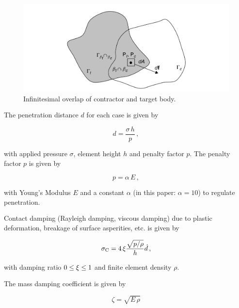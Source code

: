 \begin{figure}[!htbp]
    \centering
    \includegraphics[width=\columnwidth]{Contact.png}
    \caption{Infinitesimal overlap of contractor and target body. \cite{Mun04}}
    \label{fig:contact}
\end{figure}

\bigbreak
The penetration distance $d$ for each case is given by \cite{Mun04}

\begin{equation}
    \label{eq:d}
    d=\frac{\sigma\,h}{p}\,,
\end{equation}

with applied pressure $\sigma$, element height $h$ and penalty factor $p$. 
\bigbreak
The penalty factor $p$ is given by

\begin{equation}
    \label{eq:p}
    p=\alpha\,E\,,
\end{equation}

with \rm{Young's Modulus} $E$ and a constant $\alpha$ (in this paper: $\alpha=10$) to regulate penetration. 

\bigbreak
Contact damping (Rayleigh damping, viscous damping) due to plastic deformation, breakage of surface asperities, etc. is given by \cite{Mun04}

\begin{equation}
    \label{eq:sigmac}
    \sigma_{\rm{C}}=4\,\xi\frac{\sqrt{p/\rho}}{h}\dot{d}\,,
\end{equation}

\addtocounter{footnote}{-1}
with damping ratio $0\leq\xi\leq1$ and finite element density $\rho$.  


\bigbreak
The mass damping coefficient is given by

\begin{equation}
    \label{eq:massdamp}
    \zeta = \sqrt{E\,\rho}
\end{equation}